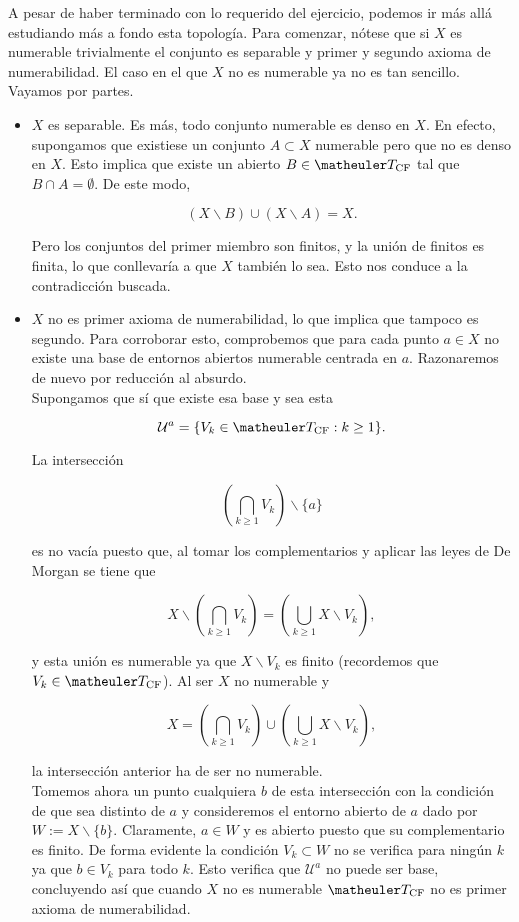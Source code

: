 A pesar de haber terminado con lo requerido del ejercicio, podemos ir más allá estudiando más a fondo esta topología. Para comenzar, nótese que si $X$ es numerable trivialmente el conjunto es separable y primer y segundo axioma de numerabilidad. El caso en el que $X$ no es numerable ya no es tan sencillo. Vayamos por partes.

\begin{itemize}
\item $X$ es separable. Es más, todo conjunto numerable es denso en $X$. En efecto, supongamos que existiese un conjunto $A \subset X$ numerable pero que no es denso en $X$. Esto implica que existe un abierto $B\in \T_{\text{CF}}$ tal que $B\cap A = \emptyset$. De este modo, 

\[(X\backslash B)\cup (X\backslash A)=X.\]

Pero los conjuntos del primer miembro son finitos, y la unión de finitos es finita, lo que conllevaría a que $X$ también lo sea. Esto nos conduce a la  contradicción buscada. 

\item $X$ no es primer axioma de numerabilidad, lo que implica que tampoco es segundo. Para corroborar esto, comprobemos que para cada punto $a\in X$ no existe una base de entornos abiertos numerable centrada en $a$. Razonaremos de nuevo por reducción al absurdo. \\

Supongamos que sí que existe esa base y sea esta 

\[\mathcal{U}^a=\{V_k \in\T_{\text{CF}}: k \geq 1\}.\]

La intersección 

\[\left(\bigcap_{k\geq 1} V_k\right)\backslash \{a\}\]

es no vacía puesto que, al tomar los complementarios y aplicar las leyes de De Morgan se tiene que 

\[X \backslash \left(\bigcap_{k\geq 1} V_k\right)= \left(\bigcup_{k\geq 1} X \backslash V_k\right), \]

y esta unión es numerable ya que $X \backslash V_k$ es finito (recordemos que $V_k \in \T_{\text{CF}}$). Al ser $X$ no numerable y 

\[X= \left(\bigcap_{k\geq 1} V_k\right) \cup \left(\bigcup_{k\geq 1} X\backslash V_k\right),\]

la intersección anterior ha de ser no numerable. \\

Tomemos ahora un punto cualquiera $b$ de esta intersección con la condición de que sea distinto de $a$ y consideremos el entorno abierto de $a$ dado por $W:=X\backslash \{b\}$. Claramente, $a\in W$ y es abierto puesto que su complementario es finito.  De forma evidente la condición $V_k \subset W$ no se verifica para ningún $k$ ya que $b\in V_k$ para todo $k$. Esto verifica que $\mathcal{U}^a$ no puede ser base, concluyendo así que cuando $X$ no es numerable $\T_{\text{CF}}$ no es primer axioma de numerabilidad.


\end{itemize}
